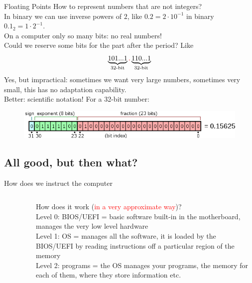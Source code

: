 \documentclass[10pt]{beamer}
\newcommand{\green}[1]{\textcolor{myGreen}{#1}}
\newcommand{\red}[1]{\textcolor{red}{#1}}
\renewcommand{\[}{\begin{equation*}}
\renewcommand{\]}{\end{equation*}}
\begin{document}
\begin{frame}{Floating Points}
How to represent numbers that are not integers?\\
In binary we can use inverse powers of $2$, like $0.2 = 2\cdot 10^{-1}$ in binary $0.1_2 = 1 \cdot 2^{-1}$.\\
On a computer only so many bits: no real numbers!\\
Could we reserve some bits for the part after the period? Like
\[
\underbrace{101...1}_{\text{32-bit}}\red{.}\underbrace{110...1}_{\text{32-bit}}
\]
Yes, but impractical: sometimes we want very large numbers, sometimes very small, this has no adaptation capability.\\
\pause
Better: scientific notation! For a 32-bit number:
\begin{figure}
    \centering
    \includegraphics[width=\textwidth]{Notes/Figures/Float_example.png}
\end{figure}

\end{frame}


\subsection{All good, but then what?}
\begin{frame}{How does we instruct the computer}
\begin{columns}
\begin{column}{0.45\textwidth}
\begin{figure}
    \centering
    
\end{figure}
\end{column}
\begin{column}{0.55\textwidth}
How does it work (\red{in a very approximate way})?\\
\green{Level 0}: BIOS/UEFI = basic software built-in in the motherboard, manages the very low level hardware\\
\green{Level 1}: OS = manages all the software, it is loaded by the BIOS/UEFI by reading instructions off a particular region of the memory\\
\green{Level 2}: programs = the OS manages your programs, the memory for each of them, where they store information etc.
\end{column}
\end{columns}
\end{frame}
\end{document}
